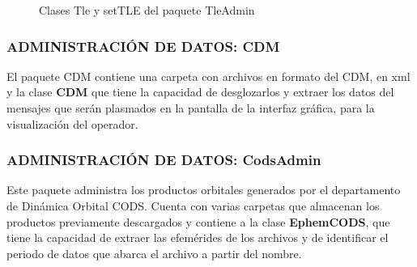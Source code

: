 \begin{figure}[!h]
\centering
  \hspace{1.5cm}
  \caption[Clases Tle y setTLE]{Clases Tle y setTLE del paquete TleAdmin}
  \label{fig:Tleadmin}
\end{figure}

\subsubsection*{ADMINISTRACI\'ON DE DATOS: CDM}
El paquete CDM contiene una carpeta con archivos en formato del CDM, en xml y la clase {\bf{CDM}} que tiene la capacidad de desglozarlos y extraer los datos del mensajes que ser\'an plasmados en la pantalla de la interfaz gr\'afica, para la visualizaci\'on del operador.\\

\subsubsection*{ADMINISTRACI\'ON DE DATOS: CodsAdmin}
Este paquete administra los productos orbitales generados por el departamento de Din\'amica Orbital \ac{CODS}.
Cuenta con varias carpetas que almacenan los productos previamente descargados y contiene a la clase {\bf{EphemCODS}}, que tiene la capacidad de extraer las efem\'erides de los archivos y de identificar el periodo de datos que abarca el archivo a partir del nombre.\\

